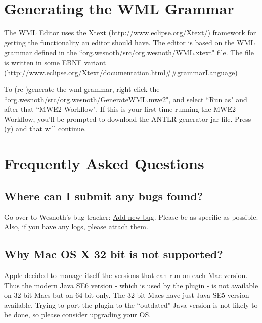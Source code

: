 \documentclass[10pt]{article}
\begin{document}
\section{Generating the WML Grammar}
The WML Editor uses the Xtext (\url{http://www.eclipse.org/Xtext/}) framework for getting the functionality an editor should have. The editor is based on the WML grammar defined in the ``org.wesnoth/src/org.wesnoth/WML.xtext" file.
The file is written in some EBNF variant (\url{http://www.eclipse.org/Xtext/documentation.html\#\#grammarLanguage})

To (re-)generate the wml grammar, right click the ``org.wesnoth/src/org.wesnoth/GenerateWML.mwe2", and select ``Run as" and after that ``MWE2 Workflow". If this is your first time running the MWE2 Workflow, you'll be prompted to download the ANTLR generator jar file. Press (y) and that will continue.

\section{Frequently Asked Questions}
\subsection{Where can I submit any bugs found?}
Go over to Wesnoth's bug tracker: \href{https://gna.org/bugs/?func=additem&group=wesnoth&bug_group_id=116}{Add new bug}. Please be as specific as possible. Also, if you have any logs, please attach them.

\subsection{Why Mac OS X 32 bit is not supported?}
Apple decided to manage itself the versions that can run on each Mac version. Thus the modern Java SE6 version - which is used by the plugin - is not available on 32 bit Macs but on 64 bit only. The 32 bit Macs have just Java SE5 version available. Trying to port the plugin to the ``outdated" Java version is not likely to be done, so please consider upgrading your OS.
\end{document}
